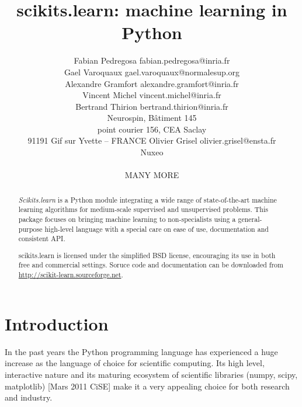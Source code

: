 \documentclass[twoside,11pt]{article}
\begin{document}
\title{scikits.learn: machine learning in Python}


\author{\name Fabian Pedregosa \email fabian.pedregosa@inria.fr \\
        \name Gael Varoquaux \email gael.varoquaux@normalesup.org  \\
        \name Alexandre Gramfort \email alexandre.gramfort@inria.fr \\
        \name Vincent Michel  \email vincent.michel@inria.fr \\
        \name Bertrand Thirion  \email bertrand.thirion@inria.fr \\
        \addr  Neurospin, B\^atiment 145\\
        point courier 156, CEA Saclay\\
        91191 Gif sur Yvette – FRANCE
        \AND
        \name Olivier Grisel \email olivier.grisel@ensta.fr \\
        \addr Nuxeo \\
        \\
        \AND
        \name MANY MORE
}



\maketitle

\begin{abstract}
\emph{Scikits.learn} is a Python module integrating
a wide range of state-of-the-art machine learning algorithms for
medium-scale supervised and unsupervised problems. This package
focuses on bringing machine learning to non-specialists using a
general-purpose high-level language with a special care on ease of use,
documentation and consistent API.


scikits.learn is licensed under the simplified BSD license,
encouraging its use in both free and commercial settings. Soruce code
and documentation can be downloaded from
\url{http://scikit-learn.sourceforge.net}.

\end{abstract}





\section{Introduction}
In the past years the Python programming language has experienced a
huge increase as the language of choice for scientific computing. Its
high level, interactive nature and its maturing ecosystem of
scientific libraries (numpy, scipy, matplotlib) [Mars 2011 CiSE]
make it a very appealing choice for both research and industry.
\end{document}
